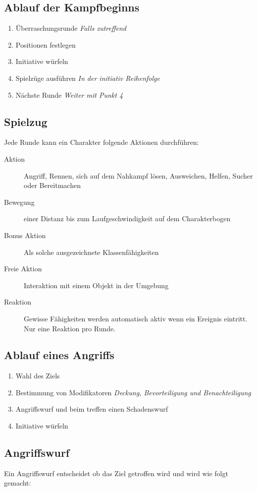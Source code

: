 \documentclass[paper=landscape,twocolumn=true,pagesize,DIV=14,fontsize=9pt]{scrartcl}
\begin{document}
\subsection{Ablauf der Kampfbeginns}
\begin{enumerate} 
\item Überraschungsrunde \textit{Falls zutreffend}
\item Positionen festlegen
\item Initiative würfeln
\item Spielzüge ausführen \textit{In der initiativ Reihenfolge}
\item Nächste Runde \textit{Weiter mit Punkt 4}
\end{enumerate}
\subsection{Spielzug}
Jede Runde kann ein Charakter folgende Aktionen durchführen:
\begin{description}
\item[Aktion] Angriff, Rennen, sich auf dem Nahkampf lösen, Ausweichen, Helfen, Sucher oder Bereitmachen
\item[Bewegung] einer Distanz bis zum Laufgeschwindigkeit auf dem Charakterbogen
\item[Bonus Aktion] Als solche ausgezeichnete Klassenfähigkeiten
\item[Freie Aktion] Interaktion mit einem Objekt in der Umgebung
\item[Reaktion] Gewisse Fähigkeiten werden automatisch aktiv wenn ein Ereignis eintritt. Nur eine Reaktion pro Runde. 
\end{description}
\subsection{Ablauf eines Angriffs}
\begin{enumerate} 
\item Wahl des Ziels
\item Bestimmung von Modifikatoren \textit{Deckung, Bevorteiligung und Benachteiligung}
\item Angriffswurf und beim treffen einen Schadenswurf
\item Initiative würfeln
\end{enumerate}
\subsection{Angriffswurf}
Ein Angriffswurf entscheidet ob das Ziel getroffen wird und wird wie folgt gemacht:
\end{document}
